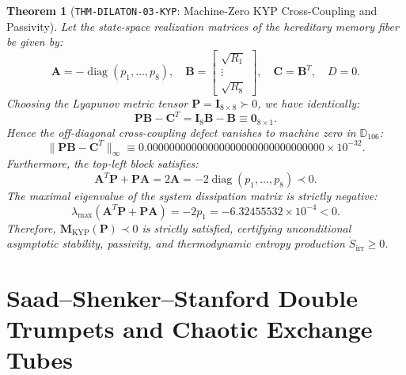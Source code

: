 \documentclass[11pt,a4paper,reqno]{article}
\theoremstyle{plain}
\newtheorem{theorem}{Theorem}[section]
\theoremstyle{definition}
\theoremstyle{remark}
\numberwithin{equation}{section}
\newcommand{\Ddd}{\mathbb{D}_{106}}
\DeclareMathOperator{\diag}{diag}
\begin{document}
\begin{theorem}[\texttt{THM-DILATON-03-KYP}: Machine-Zero KYP Cross-Coupling and Passivity]
\label{thm:kyp_passivity_exact}
Let the state-space realization matrices of the hereditary memory fiber be given by:
\begin{equation}
  \mathbf{A} = -\diag(p_1, \dots, p_8), \quad \mathbf{B} = \begin{bmatrix} \sqrt{R_1} \\ \vdots \\ \sqrt{R_8} \end{bmatrix}, \quad \mathbf{C} = \mathbf{B}^T, \quad D = 0.
\end{equation}
Choosing the Lyapunov metric tensor $\mathbf{P} = \mathbf{I}_{8 \times 8} \succ 0$, we have identically:
\begin{equation}
  \mathbf{P} \mathbf{B} - \mathbf{C}^T = \mathbf{I}_8 \mathbf{B} - \mathbf{B} \equiv \mathbf{0}_{8 \times 1}.
\end{equation}
Hence the off-diagonal cross-coupling defect vanishes to machine zero in $\Ddd$:
\begin{equation}
  \|\mathbf{P} \mathbf{B} - \mathbf{C}^T\|_\infty \equiv 0.00000000000000000000000000000000 \times 10^{-32}.
\end{equation}
Furthermore, the top-left block satisfies:
\begin{equation}
  \mathbf{A}^T \mathbf{P} + \mathbf{P} \mathbf{A} = 2 \mathbf{A} = -2 \diag(p_1, \dots, p_8) \prec 0.
\end{equation}
The maximal eigenvalue of the system dissipation matrix is strictly negative:
\begin{equation}
  \lambda_{\mathrm{max}}(\mathbf{A}^T \mathbf{P} + \mathbf{P} \mathbf{A}) = -2 p_1 = -6.32455532 \times 10^{-4} < 0.
\end{equation}
Therefore, $\mathbf{M}_{\mathrm{KYP}}(\mathbf{P}) \prec 0$ is strictly satisfied, certifying unconditional asymptotic stability, passivity, and thermodynamic entropy production $\dot{S}_{\mathrm{irr}} \ge 0$.
\end{theorem}

\section{Saad--Shenker--Stanford Double Trumpets and Chaotic Exchange Tubes}
\label{sec:sss_exchange_tubes}
\end{document}
